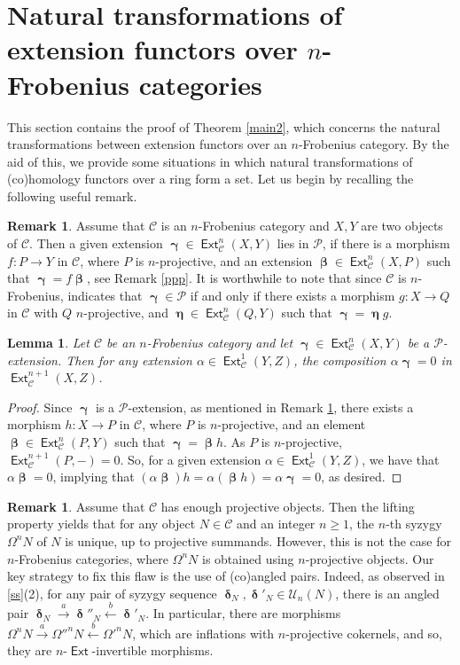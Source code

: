 \documentclass[11pt,a4paper]{amsart}
\newcommand{\rt}{\rightarrow}
\newcommand{\lf}{\leftarrow}
\newcommand{\st}{\stackrel}
\newcommand{\C}{\mathscr{C} }
\newcommand{\p}{\mathfrak{p} }
\def\Ext{\operatorname{{\mathsf{Ext}}}}
\def\syz{\mathsf{\Omega}}
\def\p{\mathcal P}
\def\U{\mathcal U}
\def\be{\operatorname{\boldsymbol{\beta}}}
\def\ga{\operatorname{\boldsymbol{\gamma}}}
\def\de{\operatorname{\boldsymbol{\delta}}}
\def\et{\operatorname{\boldsymbol{\eta}}}
\newtheorem{lem}[theorem]{Lemma}
\theoremstyle{definition}
\newtheorem{rem}[theorem]{Remark}
\theoremstyle{plain}
\theoremstyle{definition}
\numberwithin{equation}{section}
\begin{document}
\section{Natural transformations of extension functors over $n$-Frobenius categories }
This section contains the proof of Theorem \ref{main2}, which concerns the natural transformations between extension functors over an $n$-Frobenius category. By the aid of this, we provide some situations in which natural transformations of (co)homology functors over a ring form a set. Let us  begin  by recalling the following useful remark.

\begin{rem}\label{lr}Assume that $\C$ is an $n$-Frobenius category and $X, Y$ are two objects of $\C$. Then a given extension $\ga\in\Ext^n_{\C}(X, Y)$ lies in $\p$, if there is a morphism $f:P\rt Y$ in $\C$, where $P$ is $n$-projective, and an extension $\be\in\Ext^n_{\C}(X, P)$ such that $\ga=f\be$, see Remark \ref{ppp}. It is worthwhile to note that since $\C$ is $n$-Frobenius, \cite[Proposition 4.3]{bfss} indicates that $\ga\in\p$ if and only if there exists a morphism $g:X\rt Q$ in $\C$ with $Q$ $n$-projective, and $\et\in\Ext^n_{\C}(Q, Y)$ such that $\ga=\et g$.
\end{rem}

\begin{lem}\label{pp}Let $\C$ be an $n$-Frobenius category and let
$\ga\in\Ext^n_{\C}(X, Y)$ be a $\p$-extension. Then for any extension $\alpha\in\Ext^1_{\C}(Y, Z)$, the composition $\alpha\ga=0$ in $\Ext^{n+1}_{\C}(X, Z)$.
\end{lem}
\begin{proof}Since $\ga$ is a $\p$-extension, as mentioned in Remark \ref{lr}, there exists a morphism $h:X\rt P$ in $\C$, where $P$ is $n$-projective, and an element $\be\in\Ext^n_{\C}(P, Y)$ such that $\ga=\be h$. As $P$ is $n$-projective, $\Ext^{n+1}_{\C}(P, -)=0$. So, for a given extension $\alpha\in\Ext^1_{\C}(Y, Z)$, we have that $\alpha\be=0$, implying that $(\alpha\be)h=\alpha(\be h)=\alpha\ga=0$, as desired.
\end{proof}

\begin{rem}Assume that $\C$ has enough projective objects. Then the lifting property yields that for any object $N\in\C$ and an integer $n\geq 1$, the $n$-th syzygy $\syz^nN$ of $N$ is unique, up to projective summands. However, this is not the case for $n$-Frobenius categories, where $\syz^nN$ is obtained using $n$-projective objects. Our key strategy to fix this flaw is the use of (co)angled pairs. Indeed, as observed in \ref{ss}(2), for any pair of syzygy sequence $\de_{N}, \de'_N\in\U_n(N)$, there is an angled pair $\de_N\st{a}\rt\de''_N\st{b}\lf\de'_{N}$. In particular, there are morphisms $\syz^nN\st{a}\rt{\syz''}^nN\st{b}\lf{\syz'}^nN$, which are inflations with $n$-projective cokernels, and so, they are $n$-$\Ext$-invertible morphisms.
\end{rem}
\end{document}
